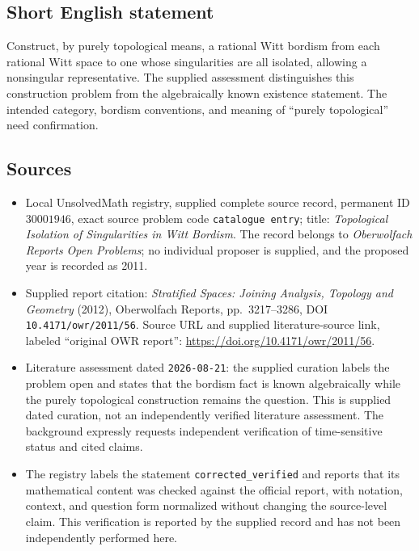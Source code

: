 \documentclass[11pt]{article}
\begin{document}
\subsection{Short English statement}
Construct, by purely topological means, a rational Witt bordism from each rational Witt space to one whose singularities are all isolated, allowing a nonsingular representative. The supplied assessment distinguishes this construction problem from the algebraically known existence statement. The intended category, bordism conventions, and meaning of ``purely topological'' need confirmation.
\subsection{Sources}
\begin{itemize}
\item Local UnsolvedMath registry, supplied complete source record, permanent ID \(30001946\), exact source problem code \texttt{catalogue entry}; title: \emph{Topological Isolation of Singularities in Witt Bordism}. The record belongs to \emph{Oberwolfach Reports Open Problems}; no individual proposer is supplied, and the proposed year is recorded as 2011.
\item Supplied report citation: \emph{Stratified Spaces: Joining Analysis, Topology and Geometry} (2012), Oberwolfach Reports, pp.\ 3217--3286, DOI \texttt{10.4171/owr/2011/56}. Source URL and supplied literature-source link, labeled ``original OWR report'': \url{https://doi.org/10.4171/owr/2011/56}.
\item Literature assessment dated \texttt{2026-08-21}: the supplied curation labels the problem open and states that the bordism fact is known algebraically while the purely topological construction remains the question. This is supplied dated curation, not an independently verified literature assessment. The background expressly requests independent verification of time-sensitive status and cited claims.
\item The registry labels the statement \texttt{corrected\_verified} and reports that its mathematical content was checked against the official report, with notation, context, and question form normalized without changing the source-level claim. This verification is reported by the supplied record and has not been independently performed here.
\end{itemize}
\end{document}

